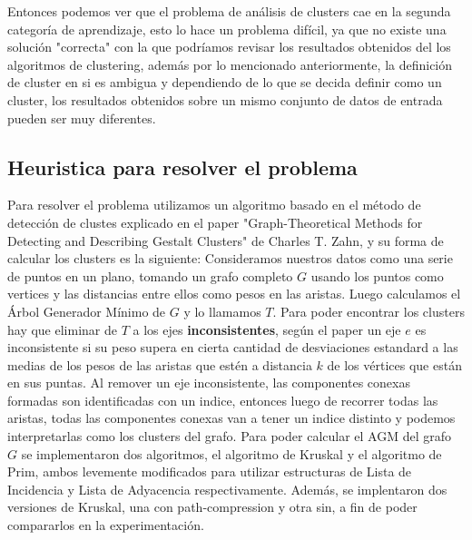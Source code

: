 \documentclass[8pt,a4paper]{article}
\begin{document}
Entonces podemos ver que el problema de análisis de clusters cae en la segunda categoría de aprendizaje, esto lo hace un problema difícil, ya que no existe una solución "correcta" con la que podríamos revisar los resultados obtenidos del los algoritmos de clustering, además por lo mencionado anteriormente, la definición de cluster en si es ambigua y dependiendo de lo que se decida definir como un cluster, los resultados obtenidos sobre un mismo conjunto de datos de entrada pueden ser muy diferentes.




\subsection{Heuristica para resolver el problema}

Para resolver el problema utilizamos un algoritmo basado en el método de detección de clustes explicado en el paper "Graph-Theoretical Methods for Detecting and Describing Gestalt Clusters" de Charles T. Zahn, y su forma de calcular los clusters es la siguiente: Consideramos nuestros datos como una serie de puntos en un plano, tomando un grafo completo $G$ usando los puntos como vertices y las distancias entre ellos como pesos en las aristas. Luego calculamos el Árbol Generador Mínimo de $G$ y lo llamamos $T$.
Para poder encontrar los clusters hay que eliminar de $T$ a los ejes \textbf{inconsistentes}, según el paper un eje $e$ es inconsistente si su peso supera en cierta cantidad de desviaciones estandard a las medias de los pesos de las aristas que estén a distancia $k$ de los vértices que están en sus puntas. Al remover un eje inconsistente, las componentes conexas formadas son identificadas con un indice, entonces luego de recorrer todas las aristas, todas las componentes conexas van a tener un  indice distinto y podemos interpretarlas como los clusters del grafo.
Para poder calcular el AGM del grafo $G$ se implementaron dos algoritmos, el algoritmo de Kruskal y el algoritmo de Prim, ambos levemente modificados para utilizar estructuras de Lista de Incidencia y Lista de Adyacencia respectivamente. Además, se implentaron dos versiones de Kruskal, una con path-compression y otra sin, a fin de poder compararlos en la experimentación.
\end{document}
